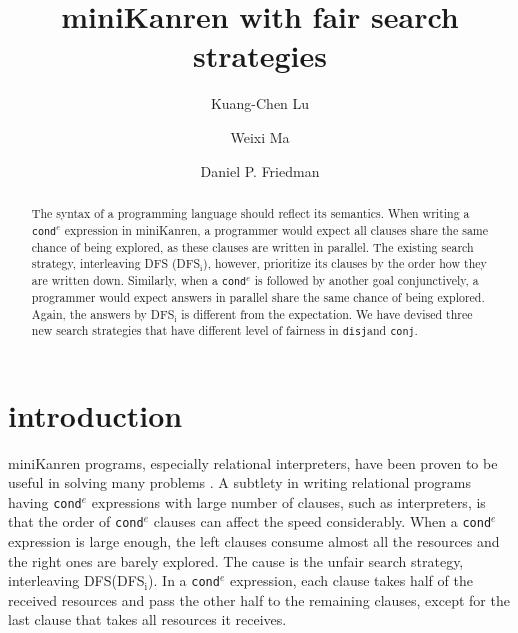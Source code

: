 \documentclass[format=acmlarge, review=true, authordraft=true]{acmart}
\title{miniKanren with fair search strategies}
\author{Kuang-Chen Lu}
\affiliation{Indiana University}
\author{Weixi Ma}
\affiliation{Indiana University}
\author{Daniel P. Friedman}
\affiliation{Indiana University}
\newcommand{\conde}{\texttt{cond$^e$} }
\newcommand{\conj}{\texttt{conj}}
\newcommand{\disj}{\texttt{disj}}
\begin{document}
\begin{abstract}

The syntax of a programming language should reflect its semantics. When writing 
a \conde expression in miniKanren, a programmer would expect all clauses share 
the same chance of being explored, as these clauses are written in 
parallel. The existing search strategy, interleaving DFS (DFS$_\textrm{i}$), however, 
prioritize its clauses by the order how they are written down. Similarly, when 
a \conde is followed by another goal conjunctively, a programmer would expect 
answers in parallel share the same chance of being explored. Again, the answers 
by DFS$_\textrm{i}$ is different from the expectation. We have devised three new search 
strategies that have different level of fairness in \disj and \conj.


\end{abstract}

\maketitle

\section{introduction}

miniKanren programs, especially relational interpreters, have been proven to be 
useful in solving many problems \citep{byrd2017unified}. A subtlety in writing 
relational programs having \conde expressions with large number of clauses,
such as interpreters, is 
that the order of \conde clauses can affect the speed considerably. When a 
\conde expression is large enough, the left clauses consume almost all the 
resources and the right ones are barely explored. The cause is the unfair
search strategy, interleaving DFS(DFS$_\textrm{i}$). In a \conde expression,
each clause takes half of the received resources and pass the other half
to the remaining clauses, except for the last clause that takes all resources
it receives.
\end{document}
